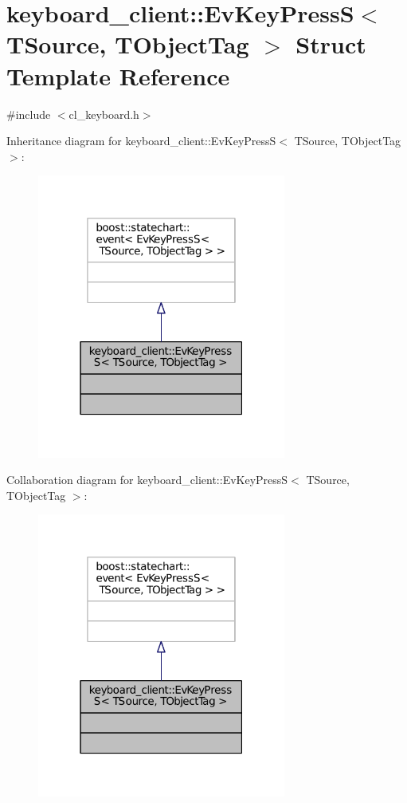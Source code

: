 \hypertarget{structkeyboard__client_1_1EvKeyPressS}{}\section{keyboard\+\_\+client\+:\+:Ev\+Key\+PressS$<$ T\+Source, T\+Object\+Tag $>$ Struct Template Reference}
\label{structkeyboard__client_1_1EvKeyPressS}


{\ttfamily \#include $<$cl\+\_\+keyboard.\+h$>$}



Inheritance diagram for keyboard\+\_\+client\+:\+:Ev\+Key\+PressS$<$ T\+Source, T\+Object\+Tag $>$\+:
\nopagebreak
\begin{figure}[H]
\begin{center}
\leavevmode
\includegraphics[width=232pt]{structkeyboard__client_1_1EvKeyPressS__inherit__graph}
\end{center}
\end{figure}


Collaboration diagram for keyboard\+\_\+client\+:\+:Ev\+Key\+PressS$<$ T\+Source, T\+Object\+Tag $>$\+:
\nopagebreak
\begin{figure}[H]
\begin{center}
\leavevmode
\includegraphics[width=232pt]{structkeyboard__client_1_1EvKeyPressS__coll__graph}
\end{center}
\end{figure}


